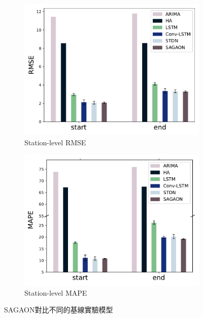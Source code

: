 \documentclass[a4paper,14pt]{extarticle}
\begin{document}
                \begin{figure}[htbp]
                    \centering
                    \begin{subfigure}{.5\columnwidth}
                        \centering
                        \includegraphics[width=\linewidth]{station_level_RMSE.pdf}
                        \caption{Station-level RMSE}
                    \end{subfigure}%
                    \hfill
                    \begin{subfigure}{.5\columnwidth}
                        \centering
                        \includegraphics[width=\linewidth]{station_level_MAPE.pdf}
                        \caption{Station-level MAPE}
                    \end{subfigure}%
                    \caption{SAGAON對比不同的基線實驗模型}
                    \label{fig:comparison}
                \end{figure}
\end{document}
